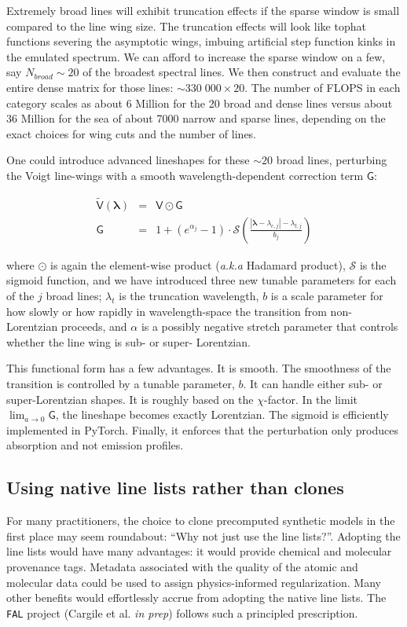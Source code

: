 \documentclass[twocolumn]{aastex631}
\begin{document}
Extremely broad lines will exhibit truncation effects if the sparse window is small compared to the line wing size. The truncation effects will look like tophat functions severing the asymptotic wings, imbuing artificial step function kinks in the emulated spectrum. We can afford to increase the sparse window on a few, say $N_{broad}\sim20$ of the broadest spectral lines. We then construct and evaluate the entire dense matrix for those lines: $\sim 330\;000 \times 20$. The number of FLOPS in each category scales as about 6 Million for the 20 broad and dense lines versus about 36 Million for the sea of about 7000 narrow and sparse lines, depending on the exact choices for wing cuts and the number of lines.

One could introduce advanced lineshapes for these $\sim20$ broad lines, perturbing the Voigt line-wings with a smooth wavelength-dependent correction term $\mathsf{G}$:

\begin{eqnarray}
    \mathsf{\tilde{V}(\bm{\lambda})} &=& \mathsf{V} \odot \mathsf{G}\\
    \mathsf{G} &=& 1 + (e^{\alpha_j} - 1) \cdot \mathcal{S}\left(\frac{|\bm{\lambda}-\lambda_{c,j}| - \lambda_{t, j}}{b_j}\right)
\end{eqnarray}

where $\odot$ is again the element-wise product (\emph{a.k.a} Hadamard product), $\mathcal{S}$ is the sigmoid function, and we have introduced three new tunable parameters for each of the $j$ broad lines; $\lambda_t$ is the truncation wavelength, $b$ is a scale parameter for how slowly or how rapidly in wavelength-space the transition from non-Lorentzian proceeds, and $\alpha$ is a possibly negative stretch parameter that controls whether the line wing is sub- or super- Lorentzian.

This functional form has a few advantages. It is smooth. The smoothness of the transition is controlled by a tunable parameter, $b$. It can handle either sub- or super-Lorentzian shapes. It is roughly based on the $\chi$-factor. In the limit $\lim_{a\to0} \mathsf{G}$, the lineshape becomes exactly Lorentzian. The sigmoid is efficiently implemented in PyTorch.
Finally, it enforces that the perturbation only produces absorption and not emission profiles.


\subsection{Using native line lists rather than clones}
For many practitioners, the choice to clone precomputed synthetic models in the first place may seem roundabout: ``Why not just use the line lists?''.  Adopting the line lists would have many advantages: it would provide chemical and molecular provenance tags.  Metadata associated with the quality of the atomic and molecular data could be used to assign physics-informed regularization.  Many other benefits would effortlessly accrue from adopting the native line lists.  The \texttt{FAL} project (Cargile et al. \emph{in prep}) follows such a principled prescription.
\end{document}
